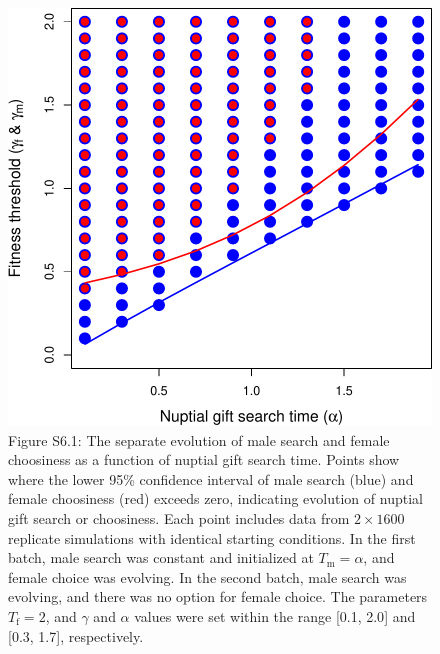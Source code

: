 \documentclass[
]{article}
\begin{document}
\begin{figure}
\centering
\includegraphics{ms_refs_fixed_files/figure-latex/unnamed-chunk-16-1.pdf}
\caption{Figure S6.1: The separate evolution of male search and female
choosiness as a function of nuptial gift search time. Points show where
the lower 95\% confidence interval of male search (blue) and female
choosiness (red) exceeds zero, indicating evolution of nuptial gift
search or choosiness. Each point includes data from \(2 \times 1600\)
replicate simulations with identical starting conditions. In the first
batch, male search was constant and initialized at
\(T_{\mathrm{m}} = \alpha\), and female choice was evolving. In the
second batch, male search was evolving, and there was no option for
female choice. The parameters \(T_{\mathrm{f}}=2\), and \(\gamma\) and
\(\alpha\) values were set within the range {[}0.1, 2.0{]} and {[}0.3,
1.7{]}, respectively.}
\end{figure}

\captionsetup{labelformat=default}
\end{document}

